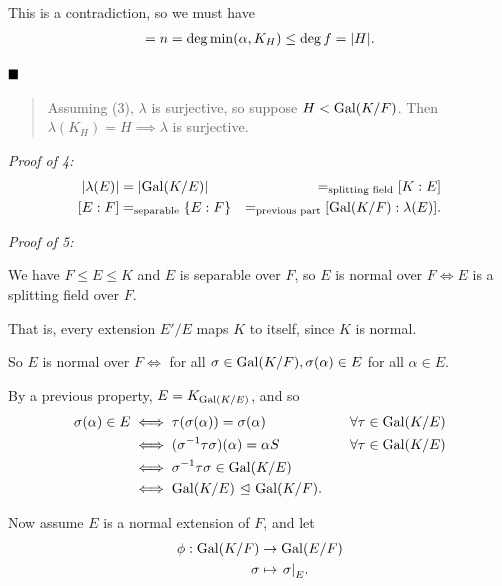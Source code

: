 This is a contradiction, so we must have
\begin{align*}
[K_H: K] = n = \deg \min(\alpha, K_H) \leq \deg f = \abs{H}
.\end{align*}

\(\qed\)

\begin{quote}
Assuming (3), \(\lambda\) is surjective, so suppose \(H < \mathrm{Gal}(K/F)\).
Then \(\lambda(K_H) = H \implies \lambda\) is surjective.
\end{quote}

\emph{Proof of 4:} \begin{align*}
{\left\lvert {\lambda(E)} \right\rvert} &= {\left\lvert {\mathrm{Gal}(K/E)} \right\rvert} &=_{\text{splitting field}} [K: E]  \\
[E: F] &=_{\text{separable}} \{E: F\} &=_{\text{previous part}} [\mathrm{Gal}(K/F): \lambda(E)]
.\end{align*}

\emph{Proof of 5:}

We have \(F\leq E \leq K\) and \(E\) is separable over \(F\), so \(E\)
is normal over \(F \iff E\) is a splitting field over \(F\).

That is, every extension \(E'/E\) maps \(K\) to itself, since \(K\) is
normal.


So \(E\) is normal over \(F \iff\) for all
\(\sigma \in \mathrm{Gal}(K/F), \sigma(\alpha) \in E\) for all \(\alpha \in E\).

By a previous property, \(E = K_{\mathrm{Gal}(K/E)}\), and so \begin{align*}
\sigma(\alpha) \in E  
&\iff \tau(\sigma(\alpha)) = \sigma(\alpha) 
&\quad \forall \tau \in \mathrm{Gal}(K/E) \\ 
&\iff (\sigma^{-1} \tau \sigma) (\alpha) = \alpha 
S&\quad \forall \tau \in \mathrm{Gal}(K/E) \\
&\iff \sigma^{-1} \tau\sigma \in \mathrm{Gal}(K/E) \\
&\iff \mathrm{Gal}(K/E) {~\trianglelefteq~} \mathrm{Gal}(K/F)
.\end{align*}

Now assume \(E\) is a normal extension of \(F\), and let \begin{align*}
\phi: \mathrm{Gal}(K/F) &\to \mathrm{Gal}(E/F) \\
\sigma &\mapsto {\left.{\sigma}\right|_{E}}
.\end{align*}

